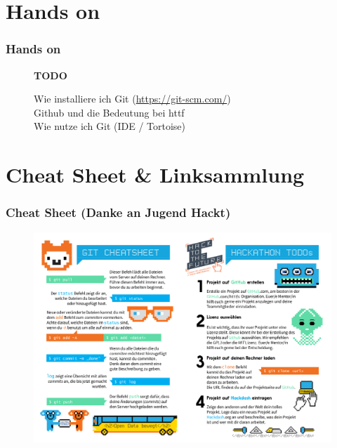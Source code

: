 \documentclass{beamer}
\begin{document}
\section{Hands on}

\begin{frame}
\frametitle{Hands on}
\begin{figure}

\textbf{TODO}

Wie installiere ich Git (\url{https://git-scm.com/}) \\
Github und die Bedeutung bei httf \\
Wie nutze ich Git (IDE / Tortoise) \\

\end{figure}

\end{frame}

\section{Cheat Sheet \& Linksammlung}

\begin{frame}
\frametitle{Cheat Sheet (Danke an Jugend Hackt)}
\begin{figure}
\includegraphics[scale=0.3]{images/Cheatsheet_git.png}
\end{figure}
\end{frame}
\end{document}
